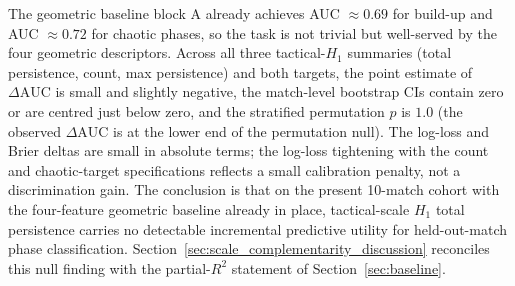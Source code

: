 The geometric baseline block A already achieves AUC \(\approx 0.69\) for build-up and AUC \(\approx 0.72\) for chaotic phases, so the task is not trivial but well-served by the four geometric descriptors. Across all three tactical-\(H_1\) summaries (total persistence, count, max persistence) and both targets, the point estimate of \(\Delta\text{AUC}\) is small and slightly negative, the match-level bootstrap CIs contain zero or are centred just below zero, and the stratified permutation \(p\) is \(1.0\) (the observed \(\Delta\text{AUC}\) is at the lower end of the permutation null). The log-loss and Brier deltas are small in absolute terms; the log-loss tightening with the count and chaotic-target specifications reflects a small calibration penalty, not a discrimination gain. The conclusion is that on the present 10-match cohort with the four-feature geometric baseline already in place, tactical-scale \(H_1\) total persistence carries no detectable incremental predictive utility for held-out-match phase classification. Section~\ref{sec:scale_complementarity_discussion} reconciles this null finding with the partial-\(R^2\) statement of Section~\ref{sec:baseline}.
